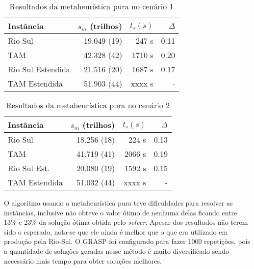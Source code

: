 \begin{table}[ht]
\caption{Resultados da metaheurística pura no cenário 1}\label{tab:puracenario1}

\begin{center}
\begin{tabular}{l |r r r}
\hline

Instância 		& $s_{m}$ (trilhos) & $t_{s}(s)$ & $\Delta$
\\
\hline

Rio Sul 			& 19.049 (19) 	& 247 s  & 0.11\\
TAM     			& 42.328 (42)	& 1710 s & 0.20\\
Rio Sul Estendida 	& 21.516 (20)	& 1687 s & 0.17\\
TAM Estendida 		& 51.903 (44)	& xxxx s & -\\

\hline
\end{tabular}
\end{center}
\end{table}


\begin{table}[ht]
\caption{Resultados da metaheurística pura no cenário 2}\label{tab:puracenario2}

\begin{center}
\begin{tabular}{l |r r r}
\hline

Instância 			& $s_{m}$ (trilhos) & $t_{s}(s)$ & $\Delta$
\\
\hline

Rio Sul 			& 18.256 (18) 	& 224 s  & 0.13\\
TAM     			& 41.719 (41)	& 2066 s & 0.19\\
Rio Sul Est. 		& 20.080 (19)	& 1592 s & 0.15\\ 
TAM Estendida 		& 51.032 (44)	& xxxx s & -\\

\hline
\end{tabular}
\end{center}

\end{table}

O algoritmo usando a metaheurística pura teve dificuldades para resolver as
instâncias, inclusive não obteve o valor ótimo de nenhuma delas ficando entre
13\% e 23\% da solução ótima obtida pelo \textit{solver}. Apesar dos
resultados não terem sido o esperado, nota-se que ele ainda é melhor que o que
era utilizado em produção pela Rio-Sul. O GRASP foi configurado para fazer 1000
repetições, pois a quantidade de soluções geradas nesse método é muito
diversificado sendo necessário mais tempo para obter soluções melhores.

